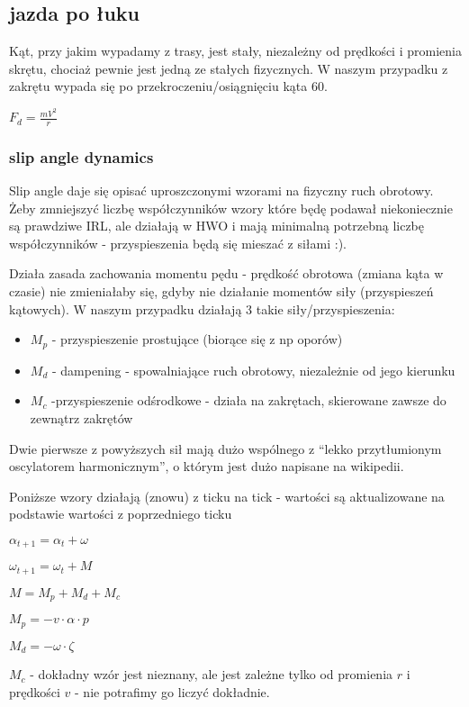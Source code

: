 \documentclass[12pt]{article}
\begin{document}
\subsection{jazda po łuku}

Kąt, przy jakim wypadamy z trasy, jest stały, niezależny od prędkości i promienia skrętu, chociaż pewnie jest jedną ze stałych fizycznych. W naszym przypadku z zakrętu wypada się po przekroczeniu/osiągnięciu kąta 60\textdegree.

$F_d = \frac{mV^2}{r}$

\subsubsection{slip angle dynamics}
Slip angle daje się opisać uproszczonymi wzorami na fizyczny ruch obrotowy. Żeby zmniejszyć liczbę współczynników wzory które będę podawał niekoniecznie są prawdziwe IRL, ale działają w HWO i mają minimalną potrzebną liczbę współczynników - przyspieszenia będą się mieszać z siłami :).

Działa zasada zachowania momentu pędu - prędkość obrotowa (zmiana kąta w czasie) nie zmieniałaby się, gdyby nie działanie momentów siły (przyspieszeń kątowych). W naszym przypadku działają 3 takie siły/przyspieszenia:
\begin{itemize}
  \item $M_p$ - przyspieszenie prostujące (biorące się z np oporów) 
 \item $M_d$ -  dampening  - spowalniające ruch obrotowy, niezależnie od jego kierunku
 \item $M_c$ -przyspieszenie odśrodkowe - działa na zakrętach, skierowane zawsze do zewnątrz zakrętów
\end{itemize}

Dwie pierwsze z powyższych sił mają dużo wspólnego z ``lekko przytłumionym oscylatorem harmonicznym'', o którym jest dużo napisane na wikipedii.

Poniższe wzory działają (znowu) z ticku na tick - wartości są aktualizowane na podstawie wartości z poprzedniego ticku

$\alpha_{t+1} = \alpha_{t} + \omega$

$\omega_{t+1} = \omega_{t} + M$

$M = M_p + M_d + M_c$

$M_p = - v \cdot  \alpha \cdot  p$

$M_d = - \omega \cdot  \zeta$

$M_c$ - dokładny wzór jest nieznany, ale jest zależne tylko od promienia $r$ i prędkości $v$ - nie potrafimy go liczyć dokładnie.
\end{document}
